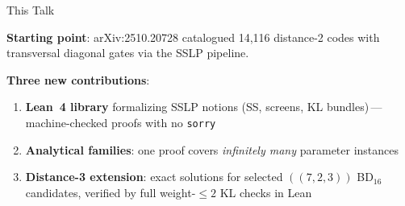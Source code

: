 \documentclass[aspectratio=169,t,10pt]{beamer}
\newcommand{\code}[1]{\texttt{\small #1}}
\begin{document}
\begin{frame}{This Talk}

\textbf{Starting point}: arXiv:2510.20728 catalogued \alert{14,116} distance-2 codes
with transversal diagonal gates via the SSLP pipeline.

\vspace{0.2em}
\textbf{Three new contributions}:
\begin{enumerate}\setlength\itemsep{1pt}
\item \textbf{Lean~4 library} formalizing SSLP notions (SS, screens, KL bundles)\,---
  machine-checked proofs with no \code{sorry}
\item \textbf{Analytical families}: one proof covers \emph{infinitely many} parameter instances
\item \textbf{Distance-3 extension}: exact solutions for selected $((7,2,3))$ BD$_{16}$ candidates,
  verified by full weight-$\le 2$ KL checks in Lean
\end{enumerate}

\vspace{0.3em}
\begin{center}
\end{center}
\end{frame}
\end{document}
